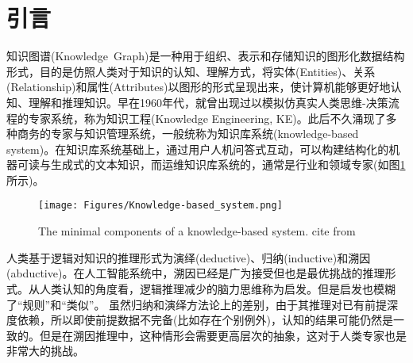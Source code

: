 \newpage
\pagestyle{empty}    %
\renewcommand{\contentsname}{\centering 目录} %
\tableofcontents
\newpage
\pagestyle{fancy}   %
\setcounter{page}{1}
\maketitle
\section{引言}
知识图谱\textrm{(Knowledge~Graph)}是一种用于组织、表示和存储知识的图形化数据结构形式，目的是仿照人类对于知识的认知、理解方式，将实体\textrm{(Entities)}、关系\textrm{(Relationship)}和属性\textrm{(Attributes)}以图形的形式呈现出来，使计算机能够更好地认知、理解和推理知识。早在1960年代，就曾出现过以模拟仿真实人类思维-决策流程的专家系统，称为知识工程\textrm{(Knowledge Engineering, KE)}。此后不久涌现了多种商务的专家与知识管理系统，一般统称为知识库系统\textrm{(knowledge-based system)}。在知识库系统基础上，通过用户人机问答式互动，可以构建结构化的机器可读与生成式的文本知识，而运维知识库系统的，通常是行业和领域专家(如图\ref{Fig:Knowledge-based_system}所示)。
\begin{figure}[h!]
\centering
\texttt{[image: Figures/Knowledge-based\_system.png]}
\caption{\small\textrm{The minimal components of a knowledge-based system. cite from~\cite{ACR56-128_2023}}}%
\label{Fig:Knowledge-based_system}
\end{figure}

人类基于逻辑对知识的推理形式为演绎\textrm{(deductive)}、归纳\textrm{(inductive)}和溯因\textrm{(abductive)}。在人工智能系统中，溯因已经是广为接受但也是最优挑战的推理形式。从人类认知的角度看，逻辑推理减少的脑力思维称为启发。但是启发也模糊了“规则”和“类似”。 虽然归纳和演绎方法论上的差别，由于其推理对已有前提深度依赖，所以即使前提数据不完备(比如存在个别例外)，认知的结果可能仍然是一致的。但是在溯因推理中，这种情形会需要更高层次的抽象，这对于人类专家也是非常大的挑战。

